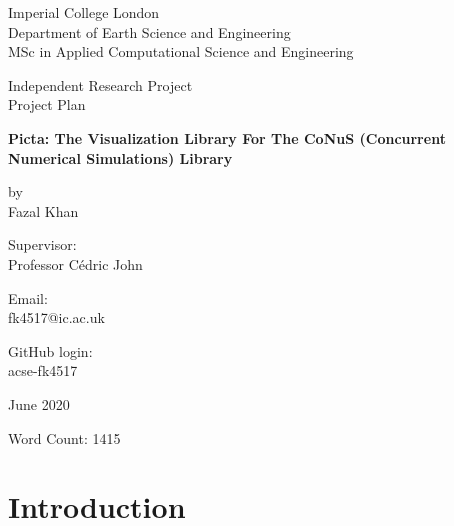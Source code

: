 \documentclass[12pt]{article}
\begin{document}
	\begin{titlepage}
		\begin{center}
			\vspace*{1cm}
			
			Imperial College London \\
			Department of Earth Science and Engineering \\
			MSc in Applied Computational Science and Engineering
			
			\vspace{1cm}
			
			Independent Research Project \\
			Project Plan
			
			\vspace{1cm}
			
			{\fontsize{18}{104}\selectfont \textbf{Picta: The Visualization Library For The CoNuS (Concurrent Numerical Simulations) Library}}
			
			\vspace{1cm}
			
			by \\ 
			Fazal Khan
			
			\vspace{1cm}
			
			Supervisor: \\
			Professor Cédric John
			
			\vspace{1cm}
			
			Email: \\
			fk4517@ic.ac.uk
			
			\vspace{1cm}
			
			GitHub login: \\
			acse-fk4517
			
			\vspace{1.0cm}
			
			June 2020
			
			\vspace{1.0cm}
			
			Word Count: 1415
			
		\end{center}
	\end{titlepage}	
	\section{Introduction}
	
\end{document}
